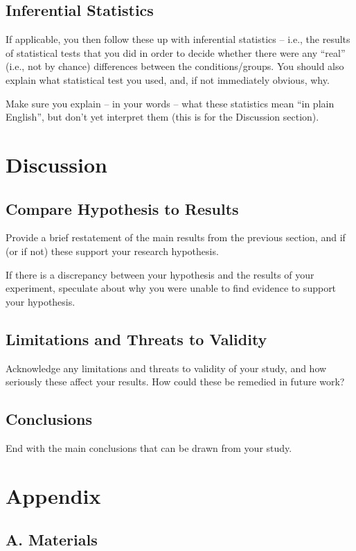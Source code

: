 \documentclass{article}
\begin{document}
\subsection{Inferential Statistics}
If applicable, you then follow these up with inferential statistics – i.e., the results of statistical tests that you did in order to decide whether there were any “real” (i.e., not by chance) differences between the conditions/groups. You should also explain what statistical test you used, and, if not immediately obvious, why.

Make sure you explain – in your words – what these statistics mean “in plain English”, but don’t yet interpret them (this is for the Discussion section).


\section{Discussion}
\subsection{Compare Hypothesis to Results}
Provide a brief restatement of the main results from the previous section, and if (or if not) these support your research hypothesis.

If there is a discrepancy between your hypothesis and the results of your experiment, speculate about why you were unable to find evidence to support your hypothesis.


\subsection{Limitations and Threats to Validity}Acknowledge any limitations and threats to validity of your study, and how seriously these affect your results. How could these be remedied in future work?

\subsection{Conclusions}

End with the main conclusions that can be drawn from your study.


\section{Appendix}
\subsection*{A. Materials}
\end{document}
